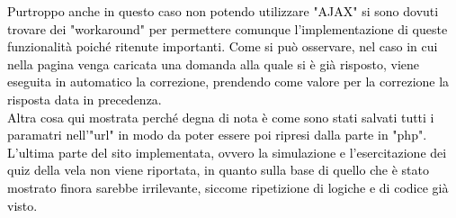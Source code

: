 \textcolor{black}{Purtroppo anche in questo caso non potendo utilizzare "AJAX" si sono dovuti trovare dei "workaround" per permettere comunque l'implementazione di queste funzionalità poiché ritenute importanti. Come si può osservare, nel caso in cui nella pagina venga caricata una domanda alla quale si è già risposto, viene eseguita in automatico la correzione, prendendo come valore per la correzione la risposta data in precedenza.\\
Altra cosa qui mostrata perché degna di nota è come sono stati salvati tutti i paramatri nell'"url" in modo da poter essere poi ripresi dalla parte in "php".}\\

\textcolor{black}{L'ultima parte del sito implementata, ovvero la simulazione e l'esercitazione dei quiz della vela non viene riportata, in quanto sulla base di quello che è stato mostrato finora sarebbe irrilevante, siccome ripetizione di logiche e di codice già visto.} 